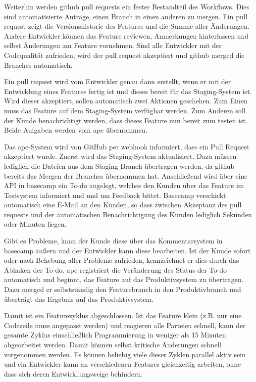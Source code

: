 Weiterhin werden \gls{github} \glspl{pull request} ein fester Bestandteil des Workflows. Dies sind automatisierte Anträge, einen Branch in einen anderen zu mergen. Ein \gls{pull request} zeigt die Versionshistorie des Features und die Summe aller Änderungen. Andere Entwickler können das Feature reviewen, Anmerkungen hinterlassen und selbst Änderungen am Feature vornehmen. Sind alle Entwickler mit der Codequalität zufrieden, wird der \gls{pull request} akzeptiert und \gls{github} merged die Branches automatisch.

Ein \gls{pull request} wird vom Entwickler genau dann erstellt, wenn er mit der Entwicklung eines Features fertig ist und dieses bereit für das Staging-System ist. Wird dieser akzeptiert, sollen automatisch zwei Aktionen geschehen. Zum Einen muss das Feature auf dem Staging-System verfügbar werden. Zum Anderen soll der Kunde benachrichtigt werden, dass dieses Feature nun bereit zum testen ist. Beide Aufgaben werden vom \gls{ape} übernommen.

Das \gls{ape}-System wird von GitHub per \Gls{webhook} informiert, dass ein Pull Request akzeptiert wurde. Zuerst wird das Staging-System aktualisiert. Dazu müssen lediglich die Dateien aus dem Staging-Branch übertragen werden, da \gls{github} bereits das Mergen der Branches übernommen hat. Anschließend wird über eine API in \gls{basecamp} ein To-do angelegt, welches den Kunden über das Feature im Testsystem informiert und und um Feedback bittet. Basecamp verschickt automatisch eine E-Mail an den Kunden, so dass zwischen Akzeptanz des \glspl{pull request} und der automatischen Benachrichtigung des Kunden lediglich Sekunden oder Minuten liegen.

Gibt es Probleme, kann der Kunde diese über das Kommentarsystem in \gls{basecamp} äußern und der Entwickler kann diese bearbeiten. Ist der Kunde sofort oder nach Behebung aller Probleme zufrieden, kennzeichnet er dies durch das Abhaken der To-do. \gls{ape} registriert die Veränderung des Status der To-do automatisch und beginnt, das Feature auf das Produktivsystem zu übertragen. Dazu merged er selbstständig den Featurebranch in den Produktivbranch und überträgt das Ergebnis auf das Produktivsystem.

Damit ist ein Featurezyklus abgeschlossen. Ist das Feature klein (z.B. nur eine Codezeile muss angepasst werden) und reagieren alle Parteien schnell, kann der gesamte Zyklus einschließlich Programmierung in weniger als 15 Minuten abgearbeitet werden. Damit können selbst kritische Änderungen schnell vorgenommen werden. Es können beliebig viele dieser Zyklen parallel aktiv sein und ein Entwickler kann an verschiedenen Features gleichzeitig arbeiten, ohne dass sich deren Entwicklungsweige behindern.

